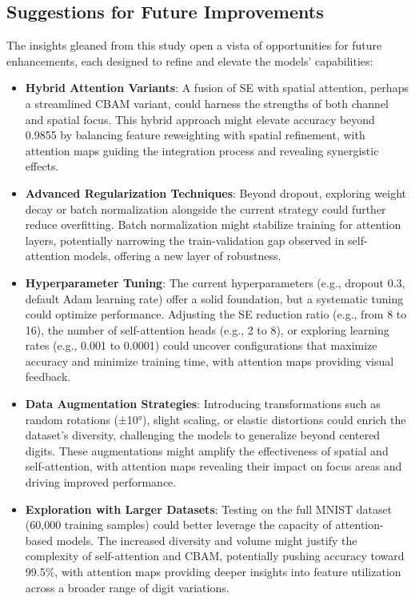 \documentclass[12pt]{article}
\begin{document}
\subsection{Suggestions for Future Improvements}
The insights gleaned from this study open a vista of opportunities for future enhancements, each designed to refine and elevate the models' capabilities:
\begin{itemize}
    \item \textbf{Hybrid Attention Variants}: A fusion of SE with spatial attention, perhaps a streamlined CBAM variant, could harness the strengths of both channel and spatial focus. This hybrid approach might elevate accuracy beyond 0.9855 by balancing feature reweighting with spatial refinement, with attention maps guiding the integration process and revealing synergistic effects.
    \item \textbf{Advanced Regularization Techniques}: Beyond dropout, exploring weight decay or batch normalization alongside the current strategy could further reduce overfitting. Batch normalization might stabilize training for attention layers, potentially narrowing the train-validation gap observed in self-attention models, offering a new layer of robustness.
    \item \textbf{Hyperparameter Tuning}: The current hyperparameters (e.g., dropout 0.3, default Adam learning rate) offer a solid foundation, but a systematic tuning could optimize performance. Adjusting the SE reduction ratio (e.g., from 8 to 16), the number of self-attention heads (e.g., 2 to 8), or exploring learning rates (e.g., 0.001 to 0.0001) could uncover configurations that maximize accuracy and minimize training time, with attention maps providing visual feedback.
    \item \textbf{Data Augmentation Strategies}: Introducing transformations such as random rotations (±10°), slight scaling, or elastic distortions could enrich the dataset's diversity, challenging the models to generalize beyond centered digits. These augmentations might amplify the effectiveness of spatial and self-attention, with attention maps revealing their impact on focus areas and driving improved performance.
    \item \textbf{Exploration with Larger Datasets}: Testing on the full MNIST dataset (60,000 training samples) could better leverage the capacity of attention-based models. The increased diversity and volume might justify the complexity of self-attention and CBAM, potentially pushing accuracy toward 99.5\%, with attention maps providing deeper insights into feature utilization across a broader range of digit variations.
\end{itemize}
\newpage
\end{document}
